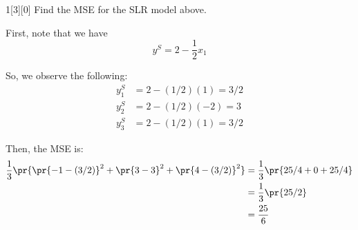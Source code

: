 \documentclass{article}
\begin{document}
\begin{dshw}{1}[3][0]
	Find the MSE for the SLR model above.
\end{dshw}
\begin{solution}
	First, note that we have
	\begin{equation*}
		y^{S} = 2 - \dfrac{1}{2}x_{1}
	\end{equation*}

	So, we observe the following:
	\begin{align*}
		y_{1}^{S} &= 2-(1/2)(1) = 3/2 \\
		y_{2}^{S} &= 2-(1/2)(-2) = 3 \\
		y_{3}^{S} &= 2-(1/2)(1) = 3/2
	\end{align*}

	Then, the MSE is:
	\begin{align*}
		\frac{1}{3}\pr{ \pr{-1 - (3/2)}^{2} + \pr{3 - 3}^{2} + \pr{4 - (3/2)}^{2}} &= \dfrac{1}{3} \pr{ 25/4 + 0 + 25/4} \\
		&= \dfrac{1}{3}\pr{25/2} \\
		&= \dfrac{25}{6}
	\end{align*}
\end{solution}
\end{document}
